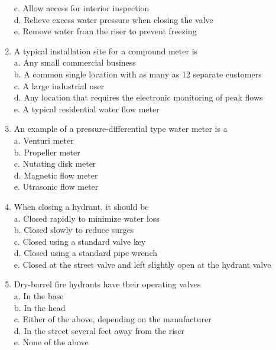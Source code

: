 \documentclass{article}
\begin{document}
\begin{enumerate}[1.]
c. Allow access for interior inspection\\

d. Relieve excess water pressure when closing the valve\\

e. Remove water from the riser to prevent freezing\\


\item A typical installation site for a compound meter is\\
a. Any small commercial business\\

b. A common single location with as many as 12 separate customers\\

c. A large industrial user\\

d. Any location that requires the electronic monitoring of peak flows\\

e. A typical residential water flow meter \\

\item An example of a pressure-differential type water meter is a\\
a. Venturi meter\\
b. Propeller meter\\
c. Nutating disk meter\\
d. Magnetic flow meter\\
e. Utrasonic flow meter\\


  \item When closing a hydrant, it should be\\
a. Closed rapidly to minimize water loss\\
b. Closed slowly to reduce surges\\
c. Closed using a standard valve key\\
d. Closed using a standard pipe wrench\\
e. Closed at the street valve and left slightly open at the hydrant valve\\

  \item Dry-barrel fire hydrants have their operating valves\\
a. In the base\\
b. In the head\\
c. Either of the above, depending on the manufacturer\\
d. In the street several feet away from the riser\\
e. None of the above\\


\end{enumerate}
\end{document}
